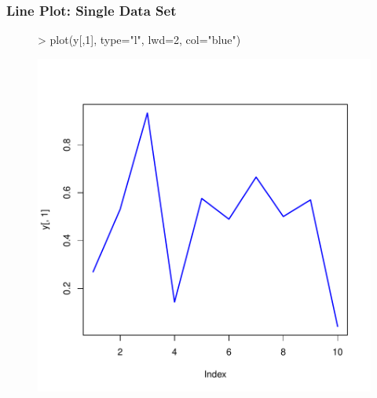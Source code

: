 \documentclass{beamer}
\begin{document}
\begin{frame}[containsverbatim]  
	\frametitle{Line Plot: Single Data Set}
\scriptsize
\begin{figure}
  \centering
\begin{Schunk}
\begin{Sinput}
> plot(y[,1], type="l", lwd=2, col="blue") 
\end{Sinput}
\end{Schunk}
\includegraphics{fig--012}
\label{fig:line_plot}
\end{figure}
\end{frame}
\end{document}
